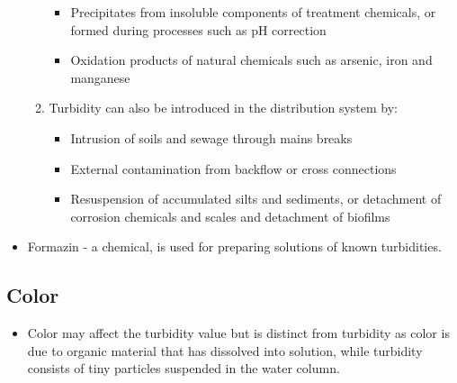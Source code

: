 \begin{itemize}
\begin{enumerate}
\begin{itemize}
\item Precipitates from insoluble components of treatment chemicals, or formed during processes such as pH correction
\item Oxidation products of natural chemicals such as arsenic, iron and manganese
\end{itemize}
\item Turbidity can also be introduced in the distribution system by: 
\begin{itemize} 
\item Intrusion of soils and sewage through mains breaks
\item External contamination from backflow or cross connections
\item Resuspension of accumulated silts and sediments, or detachment of corrosion chemicals and scales and detachment of biofilms
\end{itemize}
\end{enumerate}
\item Formazin  - a chemical, is used for preparing solutions of known turbidities.
\end{itemize}

\subsection{Color}
\begin{itemize}
\item Color may affect the turbidity value but is distinct from turbidity as color is due to organic material that has dissolved into solution, while turbidity consists of tiny particles suspended in the water column.
\end{itemize}

